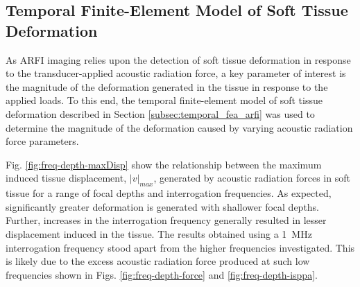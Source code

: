 		\FloatBarrier
		\subsection{Temporal Finite-Element Model of Soft Tissue Deformation}
		\label{subsec:arfi_deformation_results}
			As ARFI imaging relies upon the detection of soft tissue deformation in response to the transducer-applied acoustic radiation force, a key parameter of interest is the magnitude of the deformation generated in the tissue in response to the applied loads. To this end, the temporal finite-element model of soft tissue deformation described in Section \ref{subsec:temporal_fea_arfi} was used to determine the magnitude of the deformation caused by varying acoustic radiation force parameters.

			Fig. \ref{fig:freq-depth-maxDisp} show the relationship between the maximum induced tissue displacement, $\left| v \right|_{max}$, generated by acoustic radiation forces in soft tissue for a range of focal depths and interrogation frequencies. As expected, significantly greater deformation is generated with shallower focal depths. Further, increases in the interrogation frequency generally resulted in lesser displacement induced in the tissue. The results obtained using a \SI{1}{\MHz} interrogation frequency stood apart from the higher frequencies investigated. This is likely due to the excess acoustic radiation force produced at such low frequencies shown in Figs. \ref{fig:freq-depth-force} and \ref{fig:freq-depth-isppa}.

